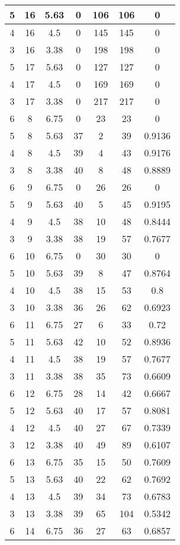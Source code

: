 \documentclass[letterpaper, 12pt]{article}
\begin{document}
\begin{longtable}{|c|c|c|c|c|c|c|}
\hline
5 & 16 & 5.63 & 0 & 106 & 106 & 0 \\
\hline
4 & 16 & 4.5 & 0 & 145 & 145 & 0 \\
\hline
3 & 16 & 3.38 & 0 & 198 & 198 & 0 \\
\hline
5 & 17 & 5.63 & 0 & 127 & 127 & 0 \\
\hline
4 & 17 & 4.5 & 0 & 169 & 169 & 0 \\
\hline
3 & 17 & 3.38 & 0 & 217 & 217 & 0 \\
\hline
6 & 8 & 6.75 & 0 & 23 & 23 & 0 \\
\hline
5 & 8 & 5.63 & 37 & 2 & 39 & 0.9136 \\
\hline
4 & 8 & 4.5 & 39 & 4 & 43 & 0.9176 \\
\hline
3 & 8 & 3.38 & 40 & 8 & 48 & 0.8889 \\
\hline
6 & 9 & 6.75 & 0 & 26 & 26 & 0 \\
\hline
5 & 9 & 5.63 & 40 & 5 & 45 & 0.9195 \\
\hline
4 & 9 & 4.5 & 38 & 10 & 48 & 0.8444 \\
\hline
3 & 9 & 3.38 & 38 & 19 & 57 & 0.7677 \\
\hline
6 & 10 & 6.75 & 0 & 30 & 30 & 0 \\
\hline
5 & 10 & 5.63 & 39 & 8 & 47 & 0.8764 \\
\hline
4 & 10 & 4.5 & 38 & 15 & 53 & 0.8 \\
\hline
3 & 10 & 3.38 & 36 & 26 & 62 & 0.6923 \\
\hline
6 & 11 & 6.75 & 27 & 6 & 33 & 0.72 \\
\hline
5 & 11 & 5.63 & 42 & 10 & 52 & 0.8936 \\
\hline
4 & 11 & 4.5 & 38 & 19 & 57 & 0.7677 \\
\hline
3 & 11 & 3.38 & 38 & 35 & 73 & 0.6609 \\
\hline
6 & 12 & 6.75 & 28 & 14 & 42 & 0.6667 \\
\hline
5 & 12 & 5.63 & 40 & 17 & 57 & 0.8081 \\
\hline
4 & 12 & 4.5 & 40 & 27 & 67 & 0.7339 \\
\hline
3 & 12 & 3.38 & 40 & 49 & 89 & 0.6107 \\
\hline
6 & 13 & 6.75 & 35 & 15 & 50 & 0.7609 \\
\hline
5 & 13 & 5.63 & 40 & 22 & 62 & 0.7692 \\
\hline
4 & 13 & 4.5 & 39 & 34 & 73 & 0.6783 \\
\hline
3 & 13 & 3.38 & 39 & 65 & 104 & 0.5342 \\
\hline
6 & 14 & 6.75 & 36 & 27 & 63 & 0.6857 \\

\end{longtable}
\end{document}
